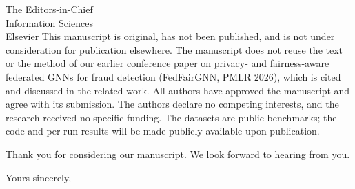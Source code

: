 \documentclass[11pt]{letter}
\begin{document}
\begin{letter}{The Editors-in-Chief\\Information Sciences\\Elsevier}
This manuscript is original, has not been published, and is not under consideration for publication elsewhere. The manuscript does not reuse the text or the method of our earlier conference paper on privacy- and fairness-aware federated GNNs for fraud detection (FedFairGNN, PMLR 2026), which is cited and discussed in the related work. All authors have approved the manuscript and agree with its submission. The authors declare no competing interests, and the research received no specific funding. The datasets are public benchmarks; the code and per-run results will be made publicly available upon publication.

Thank you for considering our manuscript. We look forward to hearing from you.

\closing{Yours sincerely,}

\end{letter}
\end{document}
